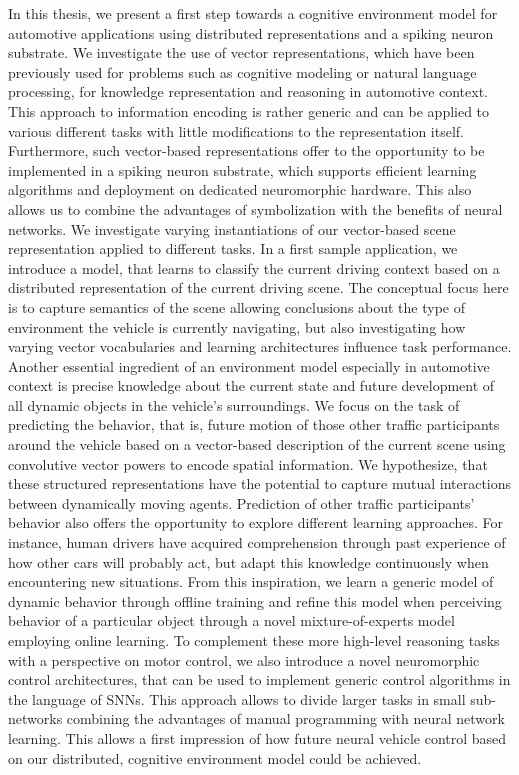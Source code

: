 In this thesis, we present a first step towards a cognitive environment model for automotive applications using distributed representations and a spiking neuron substrate.
We investigate the use of vector representations, which have been previously used for problems such as cognitive modeling or natural language processing, for knowledge representation and reasoning in automotive context.
This approach to information encoding is rather generic and can be applied to various different tasks with little modifications to the representation itself.
Furthermore, such vector-based representations offer to the opportunity to be implemented in a spiking neuron substrate, which supports efficient learning algorithms and deployment on dedicated neuromorphic hardware.
This also allows us to combine the advantages of symbolization with the benefits of neural networks.
We investigate varying instantiations of our vector-based scene representation applied to different tasks.
In a first sample application, we introduce a model, that learns to classify the current driving context based on a distributed representation of the current driving scene. 
The conceptual focus here is to capture semantics of the scene allowing conclusions about the type of environment the vehicle is currently navigating, but also investigating how varying vector vocabularies and learning architectures influence task performance.
Another essential ingredient of an environment model especially in automotive context is precise knowledge about the current state and future development of all dynamic objects in the vehicle's surroundings.
We focus on the task of predicting the behavior, that is, future motion of those other traffic participants around the vehicle based on a vector-based description of the current scene using convolutive vector powers to encode spatial information.
We hypothesize, that these structured representations have the potential to capture mutual interactions between dynamically moving agents.
Prediction of other traffic participants' behavior also offers the opportunity to explore different learning approaches.
For instance, human drivers have acquired comprehension through past experience of how other cars will probably act, but adapt this knowledge continuously when encountering new situations.
From this inspiration, we learn a generic model of dynamic behavior through offline training and refine this model when perceiving behavior of a particular object through a novel mixture-of-experts model employing online learning.
To complement these more high-level reasoning tasks with a perspective on motor control, we also introduce a novel neuromorphic control architectures, that can be used to implement generic control algorithms in the language of \acp{SNN}.
This approach allows to divide larger tasks in small sub-networks combining the advantages of manual programming with neural network learning.
This allows a first impression of how future neural vehicle control based on our distributed, cognitive environment model could be achieved.
